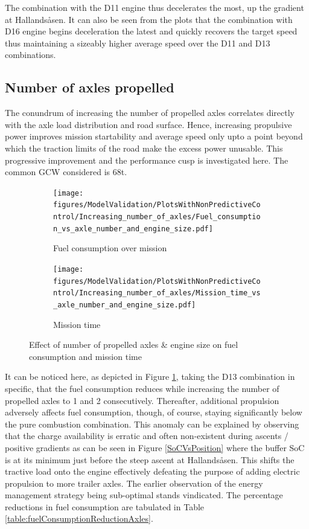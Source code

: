 \documentclass[ExampleMasters.tex]{subfiles}
\begin{document}
The combination with the D11 engine thus decelerates the most, up the gradient at Hallands\aa sen. It can also be seen from the plots that the combination with D16 engine begins deceleration the latest and quickly recovers the target speed thus maintaining a sizeably higher average speed over the D11 and D13 combinations.

\subsection{Number of axles propelled}

The conundrum of increasing the number of propelled axles correlates directly with the axle load distribution and road surface. Hence, increasing propulsive power improves mission startability and average speed only upto a point beyond which the traction limits of the road make the excess power unusable. This progressive improvement and the performance cusp is investigated here. The common GCW considered is 68t.\\

\begin{figure}[h!]
\begin{subfigure}{.5\textwidth}
	\centering
	\texttt{[image: figures/ModelValidation/PlotsWithNonPredictiveControl/Increasing\_number\_of\_axles/Fuel\_consumption\_vs\_axle\_number\_and\_engine\_size.pdf]}
	\caption{Fuel consumption over mission}
\end{subfigure}
\begin{subfigure}{.5\textwidth}
	\centering
	\texttt{[image: figures/ModelValidation/PlotsWithNonPredictiveControl/Increasing\_number\_of\_axles/Mission\_time\_vs\_axle\_number\_and\_engine\_size.pdf]}
	\caption{Mission time}
\end{subfigure}
\caption{Effect of number of propelled axles \& engine size on fuel consumption and mission time}
\label{timeFuelNumberOfAxlesEngine}
\end{figure}

It can be noticed here, as depicted in Figure \ref{timeFuelNumberOfAxlesEngine}, taking the D13 combination in specific, that the fuel consumption reduces while increasing the number of propelled axles to 1 and 2 consecutively. Thereafter, additional propulsion adversely affects fuel consumption, though, of course, staying significantly below the pure combustion combination. This anomaly can be explained by observing that the charge availability is erratic and often non-existent during ascents / positive gradients as can be seen in Figure \ref{SoCVsPosition} where the buffer SoC is at its minimum just before the steep ascent at Hallands\aa sen. This shifts the tractive load onto the engine effectively defeating the purpose of adding electric propulsion to more trailer axles. The earlier observation of the energy management strategy being sub-optimal stands vindicated. The percentage reductions in fuel consumption are tabulated in Table \ref{table:fuelConsumptionReductionAxles}.\\
\end{document}
